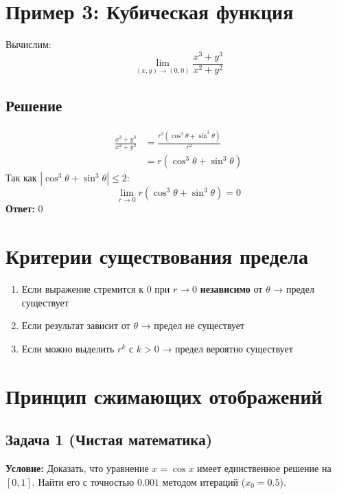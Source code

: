 \documentclass{article}
\begin{document}
\section{Пример 3: Кубическая функция}
Вычислим:
\[
\lim_{(x,y)\to(0,0)} \frac{x^3 + y^3}{x^2 + y^2}
\]

\subsection{Решение}
\begin{align*}
\frac{x^3 + y^3}{x^2 + y^2} &= \frac{r^3(\cos^3\theta + \sin^3\theta)}{r^2} \\
&= r(\cos^3\theta + \sin^3\theta)
\end{align*}
Так как $|\cos^3\theta + \sin^3\theta| \leq 2$:
\[
\lim_{r\to 0} r(\cos^3\theta + \sin^3\theta) = 0
\]
\textbf{Ответ:} $\boxed{0}$

\section{Критерии существования предела}
\begin{enumerate}
\item Если выражение стремится к 0 при $r\to 0$ \textbf{независимо} от $\theta$ → предел существует
\item Если результат зависит от $\theta$ → предел не существует
\item Если можно выделить $r^k$ с $k>0$ → предел вероятно существует
\end{enumerate}



\newpage

\section*{Принцип сжимающих отображений}

\subsection*{Задача 1 (Чистая математика)}
\textbf{Условие:} Доказать, что уравнение \(x = \cos x\) имеет единственное решение на \([0, 1]\). Найти его с точностью \(0.001\) методом итераций (\(x_0 = 0.5\)).
\end{document}
